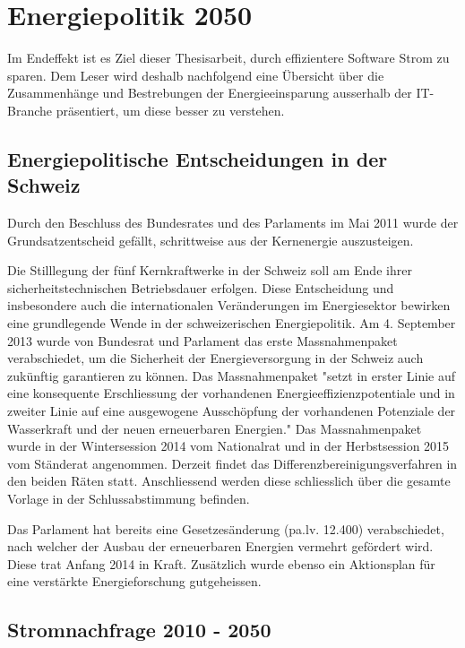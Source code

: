 \chapter{Energiepolitik 2050}

Im Endeffekt ist es Ziel dieser Thesisarbeit, durch effizientere Software Strom zu sparen. Dem Leser wird deshalb nachfolgend eine Übersicht über die Zusammenhänge und Bestrebungen der Energieeinsparung ausserhalb der IT-Branche präsentiert, um diese besser zu verstehen.



\section{Energiepolitische Entscheidungen in der Schweiz\cite{bfe_energiestrategie}}
Durch den Beschluss des Bundesrates und des Parlaments im Mai 2011 wurde der Grundsatzentscheid gefällt, schrittweise aus der Kernenergie auszusteigen. 
\par
Die Stilllegung der fünf Kernkraftwerke in der Schweiz soll am Ende ihrer sicherheitstechnischen
Betriebsdauer erfolgen. Diese Entscheidung und insbesondere auch die internationalen Veränderungen 
im Energiesektor bewirken eine grundlegende Wende in der schweizerischen Energiepolitik.
Am 4. September 2013 wurde von Bundesrat und Parlament das erste Massnahmenpaket verabschiedet, um
die Sicherheit der Energieversorgung in der Schweiz auch zukünftig garantieren zu können. Das Massnahmenpaket "setzt in erster
Linie auf eine konsequente Erschliessung der vorhandenen Energieeffizienzpotentiale und in zweiter Linie auf eine ausgewogene Ausschöpfung der vorhandenen Potenziale der Wasserkraft und der neuen erneuerbaren Energien."\cite{bfe_energiestrategie_2050} Das Massnahmenpaket wurde in der Wintersession 2014 vom Nationalrat und in der Herbstsession 2015 vom Ständerat
angenommen. Derzeit findet das Differenzbereinigungsverfahren in den beiden Räten statt. Anschliessend werden diese schliesslich über die gesamte Vorlage in der Schlussabstimmung befinden. 
\par
Das Parlament hat bereits eine Gesetzesänderung (pa.lv. 12.400) verabschiedet, nach welcher der Ausbau der erneuerbaren Energien vermehrt gefördert wird. Diese trat Anfang 2014 in Kraft. Zusätzlich wurde ebenso ein Aktionsplan für eine verstärkte Energieforschung gutgeheissen.

\section{Stromnachfrage 2010 - 2050\cite{eth_energiezukunft_schweiz}}

